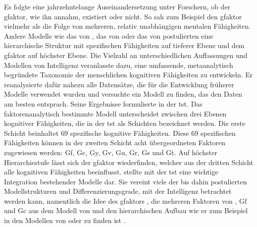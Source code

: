 \documentclass[11pt, twoside, a4paper]{book}		%
\begin{document}
Es folgte eine jahrzehntelange Auseinandersetzung unter Forschern, ob der \gls{gfaktor}, wie ihn \citet{Spearman1904, Spearman1927} annahm, existiert oder nicht. So sah zum Beispiel \citet{Thurstone1938} den \gls{gfaktor} vielmehr als die Folge von mehreren, relativ unabhängigen mentalen Fähigkeiten. Andere Modelle wie das von \citet{Vernon1950}, das von \citet{Cattell1971} oder das von \citet{Jaeger1984} postulierten eine hierarchische Struktur mit spezifischen Fähigkeiten auf tieferer Ebene und dem \gls{gfaktor} auf höchster Ebene. Die Vielzahl an unterschiedlichen Auffassungen und Modellen von Intelligenz veranlasste \citet{Carroll1993} dazu, eine umfassende, meta\-ana\-ly\-tisch begründete Taxonomie der menschlichen kognitiven Fähigkeiten zu entwickeln. Er reanalysierte dafür nahezu alle Datensätze, die für die Entwicklung früherer Modelle verwendet wurden und versuchte ein Modell zu finden, das den Daten am besten entsprach. Seine Ergebnisse formulierte \citeauthor{Carroll1993} in der \gls{tst}. Das faktorenanalytisch bestimmte Modell unterscheidet zwischen drei Ebenen kognitiver Fähigkeiten, die in der \gls{tst} als Schichten bezeichnet werden. Die erste Schicht beinhaltet $69$ spezifische kognitive Fähigkeiten. Diese $69$ spezifischen Fähigkeiten können in der zweiten Schicht acht übergeordneten Faktoren zugewiesen werden: \gls{Gf}, \gls{Gc}, \gls{Gy}, \gls{Gv}, \gls{Gu}, \gls{Gr}, \gls{Gs} und \gls{Gt}. Auf höchster Hierarchiestufe lässt sich der \gls{gfaktor} wiederfinden, welcher aus der dritten Schicht alle kognitiven Fähigkeiten beeinflusst. \citeauthor{Carroll1993} stellte mit der \gls{tst} eine wichtige Integration bestehender Modelle dar. Sie vereint viele der bis dahin postulierten Modellstrukturen und Differenzierungsgrade, mit der Intelligenz betrachtet werden kann, namentlich die Idee des \gls{gfaktor}s \citep{Spearman1904, Spearman1927}, die mehreren Faktoren von \citet{Thurstone1938}, \gls{Gf} und \gls{Gc} aus dem Modell von \citet{Cattell1971} und den hierarchischen Aufbau wie er zum Beispiel in den Modellen von \citet{Vernon1950} oder \citet{Jaeger1984} zu finden ist \citep[für eine Erweiterung der \gls{tst} siehe][]{McGrew2005, McGrew2009}.
\end{document}
